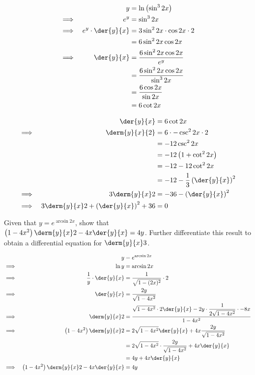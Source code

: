\documentclass{jhwhw}
\begin{document}
    \solution
        \begin{alignat*}{2}
            &&y &= \ln \left(\sin^3 2x\right)\\
            \implies&&e^y &= \sin^3 2x\\
            \implies&&e^y \cdot \der{y}{x} &= 3\sin^2 2x \cdot \cos 2x \cdot 2\\
            && &= 6\sin^2 2x \cos 2x\\
            \implies&& \der{y}{x} &= \dfrac{6\sin^2 2x \cos 2x}{e^y}\\
            && &= \dfrac{6\sin^2 2x \cos 2x}{\sin^3 2x}\\
            && &= \dfrac{6 \cos 2x}{\sin 2x}\\
            && &= 6 \cot 2x
        \end{alignat*}
        

        \begin{alignat*}{2}
            &&\der{y}{x} &= 6\cot 2x\\
            \implies&&\derm{y}{x}{2} &= 6 \cdot -\csc^2 2x \cdot 2\\
            && &= -12 \csc^2 2x\\
            && &= -12 \left(1 + \cot^2 2x\right)\\
            && &= -12 - 12\cot^2 2x\\
            && &= -12 - \dfrac13 \left(\der{y}{x}\right)^2\\
            \implies&&3\derm{y}{x}2 &= -36 - \left(\der{y}{x}\right)^2\\
            \implies&& 3\derm{y}{x}2 + \left(\der{y}{x}\right)^2 + 36 &= 0
        \end{alignat*}
        
    \problem{}
        Given that $y = e^{\arcsin{2x}}$, show that $\left(1-4x^2\right)\derm{y}{x}2 - 4x\der{y}{x} = 4y$. Further differentiate this result to obtain a differential equation for $\derm{y}{x}3$.

    \solution
        \begin{alignat*}{2}
            &&y &= e^{\arcsin{2x}}\\
            \implies&& \ln y &= \arcsin{2x}\\
            \implies&& \dfrac1y \cdot \der{y}{x} &= \dfrac{1}{\sqrt{1 - (2x)^2}} \cdot 2\\
            \implies&& \der{y}{x} &= \dfrac{2y}{\sqrt{1 - 4x^2}}\\
            \implies&& \derm{y}{x}2 &= \dfrac{\sqrt{1 - 4x^2} \cdot 2\der{y}{x} - 2y \cdot \dfrac{1}{2\sqrt{1-4x^2}} \cdot -8x}{1-4x^2}\\
            \implies&& \left(1-4x^2\right)\derm{y}{x}2 &= 2\sqrt{1 - 4x^2} \der{y}{x} + 4x \dfrac{2y}{\sqrt{1-4x^2}}\\
            && &= 2\sqrt{1 - 4x^2} \cdot \dfrac{2y}{\sqrt{1 - 4x^2}} + 4x \der{y}{x} \\
            && &= 4y + 4x \der{y}{x} \\
            \implies&& \left(1-4x^2\right)\derm{y}{x}2 -4x \der{y}{x} &= 4y \\
        \end{alignat*}
\end{document}
